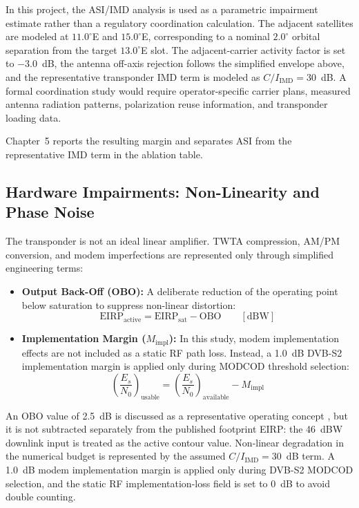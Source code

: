 In this project, the ASI/IMD analysis is used as a parametric impairment estimate rather than a regulatory coordination calculation. The adjacent satellites are modeled at $11.0^\circ$E and $15.0^\circ$E, corresponding to a nominal $2.0^\circ$ orbital separation from the target $13.0^\circ$E slot. The adjacent-carrier activity factor is set to $-3.0$~dB, the antenna off-axis rejection follows the simplified envelope above, and the representative transponder IMD term is modeled as $C/I_{\mathrm{IMD}} = 30$~dB. A formal coordination study would require operator-specific carrier plans, measured antenna radiation patterns, polarization reuse information, and transponder loading data.

Chapter~5 reports the resulting margin and separates ASI from the representative IMD term in the ablation table.

\subsection{Hardware Impairments: Non-Linearity and Phase Noise}
The transponder is not an ideal linear amplifier. TWTA compression, AM/PM conversion, and modem imperfections are represented only through simplified engineering terms:
\begin{itemize}
    \item \textbf{Output Back-Off (OBO):} A deliberate reduction of the operating point below saturation to suppress non-linear distortion:
    \begin{equation}
        \mathrm{EIRP}_{\mathrm{active}}
        =
        \mathrm{EIRP}_{\mathrm{sat}}
        -
        \mathrm{OBO}
        \qquad [\mathrm{dBW}]
    \end{equation}
    \item \textbf{Implementation Margin ($M_{\mathrm{impl}}$):} In this study, modem implementation effects are not included as a static RF path loss. Instead, a 1.0~dB DVB-S2 implementation margin is applied only during MODCOD threshold selection:
    \begin{equation}
        \left(\frac{E_s}{N_0}\right)_{\mathrm{usable}}
        =
        \left(\frac{E_s}{N_0}\right)_{\mathrm{available}}
        -
        M_{\mathrm{impl}}
    \end{equation}
\end{itemize}
An OBO value of 2.5~dB is discussed as a representative operating concept \cite{pratt}, but it is not subtracted separately from the published footprint EIRP: the 46~dBW downlink input is treated as the active contour value. Non-linear degradation in the numerical budget is represented by the assumed $C/I_{\mathrm{IMD}}=30$~dB term. A 1.0~dB modem implementation margin is applied only during DVB-S2 MODCOD selection, and the static RF implementation-loss field is set to 0~dB to avoid double counting.

